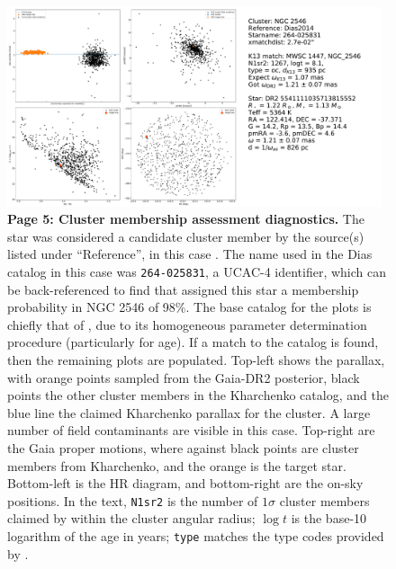 \documentclass[12pt,twocolumn,tighten]{aastex62}
\begin{document}
\begin{figure}[!h]
	\begin{center}
		\leavevmode
		\includegraphics[width=0.98\textwidth]{gaiatwo0005541111035713815552-0007_page05.pdf}
	\end{center}
	\vspace{-0.5cm}
	\caption{
		{\bf Page 5: Cluster membership assessment diagnostics.}
		The star was considered a candidate cluster member by the source(s) listed under
		``Reference'', in this case \citet{dias_proper_2014}.
		The name used in the Dias catalog in this case was \texttt{264-025831}, a
		UCAC-4 identifier, which can be back-referenced to find that \citet{dias_proper_2014}
		assigned this star a
		membership probability in NGC 2546 of 98\%.
		The base catalog for the plots is chiefly that of \citet{Kharchenko_et_al_2013},
		due to its homogeneous parameter determination procedure (particularly for age).
		If a match to the \citet{Kharchenko_et_al_2013} catalog is found, then the remaining
		plots are populated.
		Top-left shows the parallax, with orange points sampled from the Gaia-DR2
		posterior, black points the other cluster members in the Kharchenko catalog,
		and the blue line the claimed Kharchenko parallax for the cluster.
		A large number of field contaminants are visible in this case.
		Top-right are the Gaia proper motions, where against black points are cluster
		members from Kharchenko, and the orange is the target star.
		Bottom-left is the HR diagram, and bottom-right are the on-sky positions.
		In the text,
		\texttt{N1sr2} is the number of $1\sigma$ cluster members claimed
		by \citet{Kharchenko_et_al_2013} within the cluster angular radius;
		$\log t$ is the base-10 logarithm of the age in years;
		\texttt{type} matches the type codes provided by \citet{Kharchenko_et_al_2013}.
		\label{fig:pg5}
	}
\end{figure}
\end{document}
